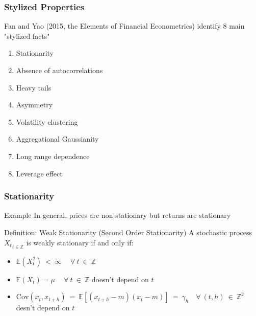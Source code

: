 \documentclass{beamer}
\begin{document}
\begin{frame}
  \frametitle{Stylized Properties}

  Fan and Yao (2015, the Elements of Financial Econometrics) identify 8 main "stylized facts"
  
  \begin{enumerate}
  \item Stationarity
  \item Absence of autocorrelations
  \item Heavy tails
  \item Asymmetry
  \item Volatility clustering
  \item Aggregational Gaussianity
  \item Long range dependence
  \item Leverage effect
  \end{enumerate}
  
\end{frame}



\begin{frame}
  \frametitle{Stationarity}
  \begin{exampleblock}{Example}
   In general, prices are non-stationary but returns are stationary 
 \end{exampleblock}

 \begin{block}{Definition: Weak Stationarity (Second Order Stationarity)}
   A stochastic process ${X_t}_{t \in \mathbb{Z}}$ is weakly stationary if and only if:

   \begin{itemize}
   \item $\mathbb{E}(X^2_t) \ < \ \infty \ \quad \forall \ t \ \in \ \mathbb{Z}$
   \item $\mathbb{E}(X_t) = \mu \ \quad \forall \ t \ \in \ \mathbb{Z}$ doesn't depend on $t$
   \item $\text{Cov}(x_t, x_{t+h}) \ = \ \mathbb{E}[(x_{t+h} - m)(x_t - m)] \ = \ \gamma_h \quad \forall \ (t, h) \ \in \ \mathbb{Z}^2$ desn't depend on $t$
   \end{itemize}
   
 \end{block}
 
\end{frame}


  
\end{document}
